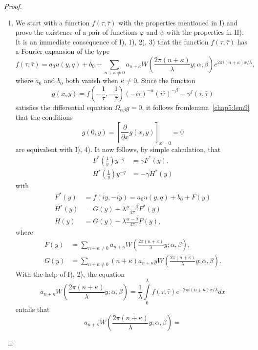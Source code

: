 \begin{proof}
\begin{enumerate}
\renewcommand{\theenumi}{\Alph{enumi}}
\renewcommand{\labelenumi}{\theenumi)}
\item We start with a function $f(\tau,\bar{\tau})$ with the
properties mentioned in I) and prove the existence of a pair of
functions $\varphi$ and $\psi$ with the properties in II). It is an
immediate consequence of I), 1), 2), 3) that the function
$f(\tau,\bar{\tau})$ has a Fourier expansion of the type
$$
f(\tau,\bar{\tau}) = a_0 u(y,q) + b_0 + \sum_{n+\kappa\neq 0}
a_{n+\kappa} W(\frac{2\pi(n+\kappa)}{\lambda}y;\alpha,\beta) e^{2\pi i
  (n+\kappa)x/\lambda},
$$
where $a_0$ and $b_0$ both vanish when $\kappa\neq 0$. Since the
function
$$
g(x,y) = f(-\frac{1}{\tau}, -\frac{1}{\bar{\tau}}) (-i\tau)^{-\alpha}
(i\bar{\tau})^{-\beta} -\gamma^f(\tau,\bar{\tau})
$$
satisfies the differential equation $\Omega _{\alpha\beta}g=0$, it
follows from\break lemma~\ref{chap5:lem9} that \pageoriginale the conditions
\begin{equation*}
g(0,y) = [\frac{\partial}{\partial x} 
g(x,y)]_{x=0} =0 \tag{5}\label{c5:eq2:5}
\end{equation*}
are equivalent with I), 4). It now follows, by simple calculation,
that 
\begin{align*}
F^{\ast} (\frac{1}{y}) y^{-q} & = \gamma F^{\ast} (y),\\
H^{\ast} (\frac{1}{y}) y^{-q} 
& = -\gamma H^{\ast}(y) \tag{6}\label{c5:eq2:6}
\end{align*}
with 
\begin{align*}
F^{\ast}(y) & = f(iy,-iy) = a_0u(y,q) + b_0 + F(y)\\
H^{\ast} (y) & = G(y) -\lambda\frac{\alpha-
\beta}{4\pi} F^{\ast}(y) \tag{7}\label{c5:eq2:7}\\
H(y) & = G(y) -\lambda\frac{\alpha-\beta}{4\pi} F(y),
\end{align*}
where 
\begin{align*}
F(y) & = \sum_{n+\kappa \neq 0} a_{n+\kappa}
W(\frac{2\pi(n+\kappa)}{\lambda}y;
\alpha,\beta), \tag{8}\label{c5:eq2:8}\\
G(y) & = \sum_{n+\kappa\neq 0} (n+\kappa) a_{n+\kappa} y
W(\frac{2\pi(n+\kappa)}{\lambda}y;\alpha,\beta). 
\end{align*}
With the help of I), 2), the equation
$$
a_{n+\kappa} W(\frac{2\pi(n+\kappa)}{\lambda} y;\alpha,\beta) =
\frac{1}{\lambda} \int\limits^{\lambda}_0 f(\tau,\bar{\tau}) e^{-2\pi
  i(n+\kappa)x/\lambda}dx 
$$
entails that
$$
a_{n+\kappa} W(\frac{2\pi(n+\kappa)}{\lambda} y;\alpha,\beta) = 
$$
\end{enumerate}
\end{proof}
